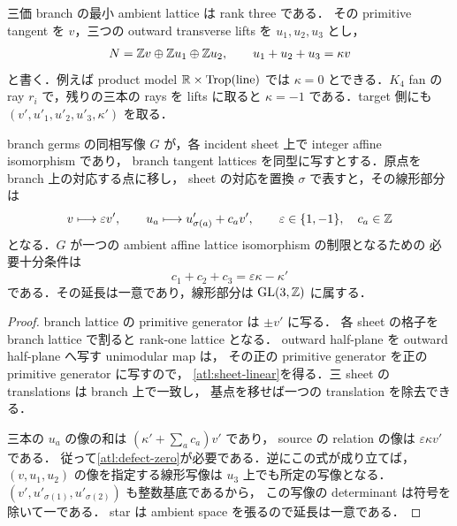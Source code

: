 三価 branch の最小 ambient lattice は rank three である．
その primitive tangent を $v$，三つの outward transverse lifts を $u_1,u_2,u_3$ とし，
\begin{equation}\label{atl:branch-relation}
 N=\mathbb Z v\oplus\mathbb Z u_1\oplus\mathbb Z u_2,
 \qquad u_1+u_2+u_3=\kappa v
\end{equation}
と書く．例えば product model $\mathbb R\times\operatorname{Trop}(\text{line})$ では
$\kappa=0$ とできる．$K_4$ fan の ray $r_i$ で，残りの三本の rays を lifts に取ると
$\kappa=-1$ である．target 側にも $(v',u'_1,u'_2,u'_3,\kappa')$ を取る．

\begin{lemma}
\label{atl:branch-extension}
branch germs の同相写像 $G$ が，各 incident sheet 上で integer affine isomorphism であり，
branch tangent lattices を同型に写すとする．原点を branch 上の対応する点に移し，
sheet の対応を置換 $\sigma$ で表すと，その線形部分は
\begin{equation}\label{atl:sheet-linear}
 v\longmapsto\varepsilon v',\qquad
 u_a\longmapsto u'_{\sigma(a)}+c_a v',
 \qquad \varepsilon\in\{1,-1\},\quad c_a\in\mathbb Z
\end{equation}
となる．$G$ が一つの ambient affine lattice isomorphism の制限となるための
必要十分条件は
\begin{equation}\label{atl:defect-zero}
 c_1+c_2+c_3=\varepsilon\kappa-\kappa'
\end{equation}
である．その延長は一意であり，線形部分は $\operatorname{GL}(3,\mathbb Z)$ に属する．
\end{lemma}

\begin{proof}
branch lattice の primitive generator は $\pm v'$ に写る．
各 sheet の格子を branch lattice で割ると rank-one lattice となる．
outward half-plane を outward half-plane へ写す unimodular map は，
その正の primitive generator を正の primitive generator に写すので，
\eqref{atl:sheet-linear}を得る．三 sheet の translations は branch 上で一致し，
基点を移せば一つの translation を除去できる．

三本の $u_a$ の像の和は $(\kappa'+\sum_a c_a)v'$ であり，
source の relation の像は $\varepsilon\kappa v'$ である．
従って\eqref{atl:defect-zero}が必要である．逆にこの式が成り立てば，
$(v,u_1,u_2)$ の像を指定する線形写像は $u_3$ 上でも所定の写像となる．
$(v',u'_{\sigma(1)},u'_{\sigma(2)})$ も整数基底であるから，
この写像の determinant は符号を除いて一である．
star は ambient space を張るので延長は一意である．
\end{proof}

